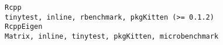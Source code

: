 \documentclass[
  letterpaper,
  DIV=11,
  numbers=noendperiod]{scrreprt}
\begin{document}
\begin{verbatim}
Rcpp                                                                                                                                                                                                                                                                                                                                                                                                                                                                                                                                                                                                                                                                                                                                                                                                                                                                                                                                                                                                                                                                                                                                                                                                                                                       tinytest, inline, rbenchmark, pkgKitten (>= 0.1.2)
RcppEigen                                                                                                                                                                                                                                                                                                                                                                                                                                                                                                                                                                                                                                                                                                                                                                                                                                                                                                                                                                                                                                                                                                                                                                                                                                                 Matrix, inline, tinytest, pkgKitten, microbenchmark

\end{verbatim}
\end{document}
